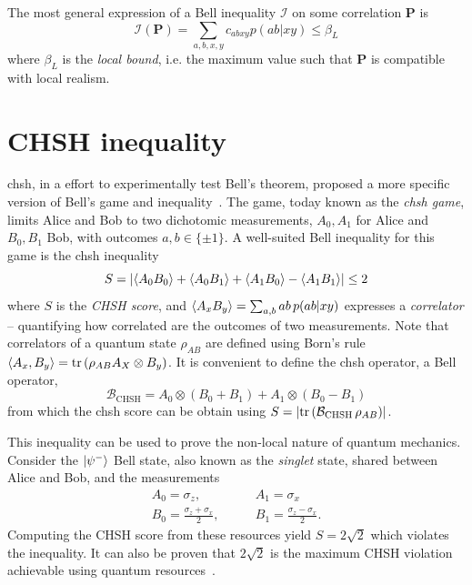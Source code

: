 \medbreak

The most general expression of a Bell inequality $\mathcal{I}$ on some correlation $\mathbf{P}$ is
\begin{equation}
	\mathcal{I}(\mathbf{P}) = \sum_{a,b,x,y}c_{abxy} p(ab|xy) \leq \beta_L
	\label{eq:bell_inequality}
\end{equation}
where $\beta_L$ is the \textit{local bound}, i.e. the maximum value such that $\mathbf{P}$ is compatible with local realism.

\section{CHSH inequality}

\acrfull{chsh}, in a effort to experimentally test Bell's theorem, proposed a more specific version of Bell's game and inequality~\cite{Clauser1969}.
The game, today known as the \textit{\acrshort{chsh} game}, limits Alice and Bob to two dichotomic measurements, $A_0,A_1$ for Alice and $B_0,B_1$ Bob, with outcomes $a,b\in\{\pm 1\}$. 
A well-suited Bell inequality for this game is the \acrshort{chsh} inequality 
\begin{equation}
	S = \left | \langle {A_0 B_0} \rangle + \langle {A_0 B_1} \rangle + \langle {A_1 B_0} \rangle - \langle {A_1 B_1} \rangle  \right | \leq 2
	\label{eq:CHSH}
\end{equation}
where $S$ is the \textit{CHSH score}, and $\langle {A_x B_y} \rangle = \sum_{a,b} ab\,p(ab|xy)$ expresses a \textit{correlator} -- quantifying how correlated are the outcomes of two measurements.
Note that correlators of a quantum state $\rho_{AB}$ are defined using Born's rule $\mean{A_x,B_y} = \trr{\rho_{AB} A_X \otimes B_y}$.
It is convenient to define the \acrshort{chsh} operator, a Bell operator,
\begin{equation}
	\mathcal{B}_{\mathrm{CHSH}} = A_0 \otimes \left( B_0 + B_1 \right) + A_1 \otimes \left( B_0 - B_1 \right)
	\label{eq:CHSH_operator}
\end{equation}
from which the \acrshort{chsh} score can be obtain using $S = \left| \trr{\mathcal{B}_\mathrm{CHSH}\, \rho_{AB} } \right|$.

\medbreak

This inequality can be used to prove the non-local nature of quantum mechanics. 
Consider the $\ket{\psi^-}$ Bell state, also known as the \textit{singlet} state, shared between Alice and Bob, and the measurements
\begin{equation}
	\begin{split}
		A_0 = \sigma_z, \quad & \quad A_1 = \sigma_x \\
		B_0 = \frac{\sigma_z+\sigma_x}{2}, \quad &\quad B_1 = \frac{\sigma_z - \sigma_x}{2}.
		\label{eq:CHSH_measurement}
	\end{split}
\end{equation}
Computing the CHSH score from these resources yield $S=2\sqrt{2}$ which violates the inequality.
It can also be proven that $2\sqrt{2}$ is the maximum CHSH violation achievable using quantum resources~\cite{Tsirelson1980}.

